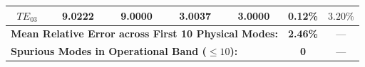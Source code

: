 \documentclass[VANCOUVER,Times1COL]{WileyNJD-v5}
\begin{document}
\begin{table}[!t]
{\begin{tabular}{ccccccc}
            $TE_{03}$                                                                        & 9.0222                                                    & 9.0000                                                    & 3.0037                                                 & 3.0000                                                 & \textbf{0.12\%}                                 & $3.20\%$                                      \\
            \midrule
            \multicolumn{5}{l}{\textbf{Mean Relative Error across First 10 Physical Modes:}} & \textbf{2.46\%}                                           & ---                                                                                                                                                                                                                                                                           \\
            \multicolumn{5}{l}{\textbf{Spurious Modes in Operational Band ($\le 10$):}}      & \textbf{0}                                                & ---                                                                                                                                                                                                                                                                           \\
            \bottomrule
        \end{tabular}
    }
\end{table}
\end{document}
